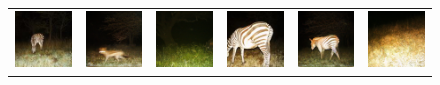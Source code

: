 \begin{figure}[htp!]
\begin{tabularx}{\textwidth}{>{\centering\arraybackslash}X >{\centering\arraybackslash}X >{\centering\arraybackslash}X >{\centering\arraybackslash}X >{\centering\arraybackslash}X >{\centering\arraybackslash}X}
        \includegraphics{gfx/unconditional-diffusion-sampling-qual/rgb_S2_B04_R3_IMAG0432.jpg} & \includegraphics{gfx/unconditional-diffusion-sampling-qual/cyclegan_S2_B06_R1_PICT0128_fake.png} & \includegraphics{gfx/unconditional-diffusion-sampling-qual/diffusion_S2_B06_R1_PICT0128.png} & \includegraphics{gfx/unconditional-diffusion-sampling-qual/rgb_S2_B04_R3_IMAG0471.jpg} & \includegraphics{gfx/unconditional-diffusion-sampling-qual/cyclegan_S2_B06_R1_PICT0279_fake.png} & \includegraphics{gfx/unconditional-diffusion-sampling-qual/diffusion_S2_B06_R1_PICT0279.png} \\

\end{tabularx}
\end{figure}
